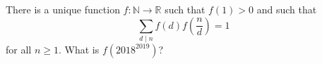 There is a unique function $f: \mathbb{N} \to \mathbb{R}$ such that $f(1) > 0$ and such that
\[\sum_{d \mid n} f(d) f\left(\frac{n}{d}\right) = 1\]for all $n \ge 1$. What is $f(2018^{2019})$?